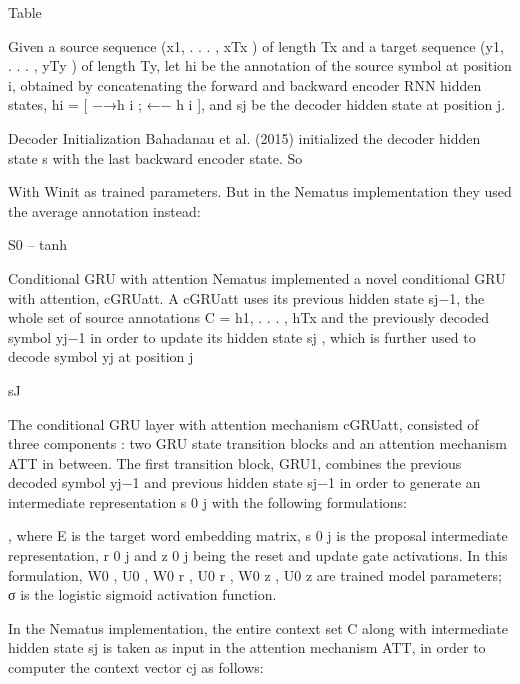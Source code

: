 Table 







Given a source sequence (x1, . . . , xTx ) of length Tx and a target sequence (y1, . . . , yTy ) of length Ty, let hi be the annotation of the source symbol at position i, obtained by concatenating the forward and backward encoder RNN hidden states, hi = [ −→h i ; ←− h i ], and sj be the decoder hidden state at position j.

Decoder Initialization	Bahadanau et al. (2015) initialized the decoder hidden state s with the last backward encoder state.
So




With Winit as trained parameters. But in the Nematus implementation they used the average annotation instead:



S0 – tanh


Conditional GRU with attention Nematus implemented a novel conditional GRU with attention, cGRUatt. A cGRUatt uses its previous hidden state sj−1, the whole set of source annotations C = {h1, . . . , hTx} and the previously decoded symbol yj−1 in order to update its hidden state sj , which is further used to decode symbol yj at position j

sJ



The conditional GRU layer with attention mechanism cGRUatt, consisted of three components : two GRU state transition blocks and an attention mechanism ATT in between. The first transition block, GRU1, combines the previous decoded symbol yj−1 and previous hidden state sj−1 in order to generate an intermediate representation s 0 j with the following formulations:











, where E is the target word embedding matrix, s 0 j is the proposal intermediate representation, r 0 j and z 0 j being the reset and update gate activations. In this formulation, W0 , U0 , W0 r , U0 r , W0 z , U0 z are trained model parameters; σ is the logistic sigmoid activation function.

In the Nematus implementation, the entire context set C along with intermediate hidden state sj is taken as input in the attention mechanism ATT, in order to computer the context vector cj as follows:











